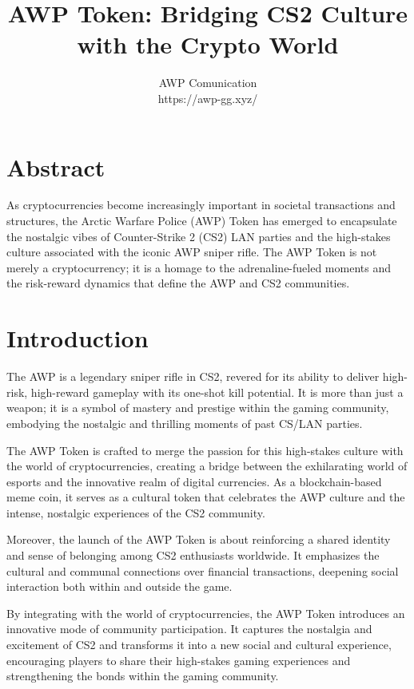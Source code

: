 \documentclass[journal,onecolumn,]{IEEEtran}
\title{AWP Token: Bridging CS2 Culture \\ with the Crypto World}
\author{AWP Comunication \\ https://awp-gg.xyz/}
\date{}
\begin{document}
	
	\maketitle
	
	
	
	\section*{Abstract}
	As cryptocurrencies become increasingly important in societal transactions and structures, the Arctic Warfare Police (AWP) Token has emerged to encapsulate the nostalgic vibes of Counter-Strike 2 (CS2) LAN parties and the high-stakes culture associated with the iconic AWP sniper rifle. The AWP Token is not merely a cryptocurrency; it is a homage to the adrenaline-fueled moments and the risk-reward dynamics that define the AWP and CS2 communities.
	
	\section{Introduction}
	The AWP is a legendary sniper rifle in CS2, revered for its ability to deliver high-risk, high-reward gameplay with its one-shot kill potential. It is more than just a weapon; it is a symbol of mastery and prestige within the gaming community, embodying the nostalgic and thrilling moments of past CS/LAN parties\cite{CSGOBombCode}\cite{PixelsUnderstandingSignificance}.
	
	The AWP Token is crafted to merge the passion for this high-stakes culture with the world of cryptocurrencies\cite{nakamotoBitcoinPeertoPeerElectronic}, creating a bridge between the exhilarating world of esports and the innovative realm of digital currencies. As a blockchain-based meme coin, it serves as a cultural token that celebrates the AWP culture and the intense, nostalgic experiences of the CS2 community.
	
	Moreover, the launch of the AWP Token is about reinforcing a shared identity and sense of belonging among CS2 enthusiasts worldwide. It emphasizes the cultural and communal connections over financial transactions, deepening social interaction both within and outside the game.
	
	By integrating with the world of cryptocurrencies, the AWP Token introduces an innovative mode of community participation. It captures the nostalgia and excitement of CS2 and transforms it into a new social and cultural experience, encouraging players to share their high-stakes gaming experiences and strengthening the bonds within the gaming community.
	
\end{document}
